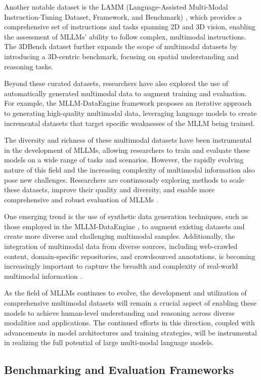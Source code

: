 \documentclass[11pt]{article}
\begin{document}
Another notable dataset is the LAMM (Language-Assisted Multi-Modal Instruction-Tuning Dataset, Framework, and Benchmark) \cite{ref48}, which provides a comprehensive set of instructions and tasks spanning 2D and 3D vision, enabling the assessment of MLLMs' ability to follow complex, multimodal instructions. The 3DBench dataset \cite{ref49} further expands the scope of multimodal datasets by introducing a 3D-centric benchmark, focusing on spatial understanding and reasoning tasks.

Beyond these curated datasets, researchers have also explored the use of automatically generated multimodal data to augment training and evaluation. For example, the MLLM-DataEngine \cite{ref50} framework proposes an iterative approach to generating high-quality multimodal data, leveraging language models to create incremental datasets that target specific weaknesses of the MLLM being trained.

The diversity and richness of these multimodal datasets have been instrumental in the development of MLLMs, allowing researchers to train and evaluate these models on a wide range of tasks and scenarios. However, the rapidly evolving nature of this field and the increasing complexity of multimodal information also pose new challenges. Researchers are continuously exploring methods to scale these datasets, improve their quality and diversity, and enable more comprehensive and robust evaluation of MLLMs \cite{ref51,ref52}.

One emerging trend is the use of synthetic data generation techniques, such as those employed in the MLLM-DataEngine \cite{ref50}, to augment existing datasets and create more diverse and challenging multimodal samples. Additionally, the integration of multimodal data from diverse sources, including web-crawled content, domain-specific repositories, and crowdsourced annotations, is becoming increasingly important to capture the breadth and complexity of real-world multimodal information \cite{ref53}.

As the field of MLLMs continues to evolve, the development and utilization of comprehensive multimodal datasets will remain a crucial aspect of enabling these models to achieve human-level understanding and reasoning across diverse modalities and applications. The continued efforts in this direction, coupled with advancements in model architectures and training strategies, will be instrumental in realizing the full potential of large multi-modal language models.

\subsection{Benchmarking and Evaluation Frameworks}
\end{document}
